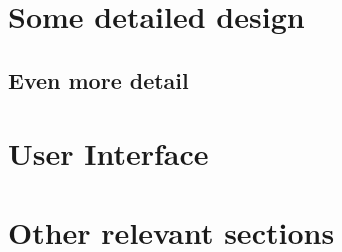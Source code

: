 \section{Some detailed design}

\subsection{Even more detail}

\section{User Interface}

\section{Other relevant sections}